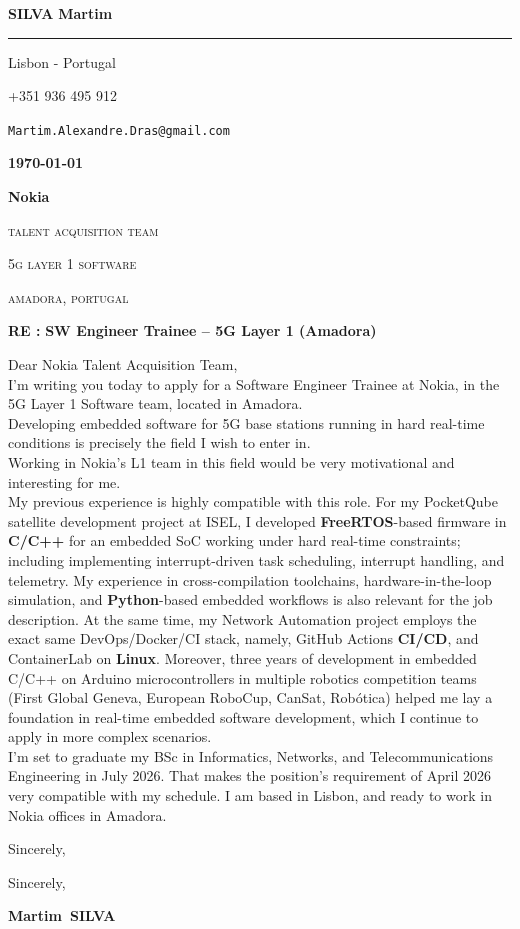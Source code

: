 \documentclass[12pt]{article}
\newcommand{\firstname}{Martim}
\newcommand{\lastname}{Silva}
\newcommand{\mainColor}{nokiaBlue}
\newlength{\spacebox}
\newcommand{\shspace}{\hspace*{0.8em}}
\newcommand{\xvspace}{\vspace*{0.1em}}
\newcommand{\svspace}{\vspace*{0.5em}}
\newcommand{\mvspace}{\vspace*{1.5em}}
\newcommand{\hvspace}{\vspace*{2.5em}}
\newcommand{\negmvspace}{\vspace*{-1em}}
\newcommand{\userInfo}[4]{
    \begin{flushleft}
        \color{\mainColor}
        \Huge
        \textbf{\MakeUppercase{\lastname}}
        \color{black}
        \textbf{\firstname}
        \color{\mainColor}
        \noindent\rule{19.1cm}{0.8pt}
        \color{grayShy}
        \small
        \par
        \parbox{7\spacebox} {
            \faMap \shspace #1 - #2 \par \svspace
            \faPhone \shspace #3 \par \svspace
            \faEnvelopeOpen \shspace \texttt{#4} \par \svspace
        }
        \color{\mainColor}
        \mvspace
    \end{flushleft}
    \negmvspace
}
\newcommand{\companyInfo}[4]{
    \begin{flushright}
        \parbox{4\spacebox}{
            \raggedleft
            \small
            \textbf{\today}\par
            \xvspace
            \textbf{#1}\par
            \mvspace
            \color{grayShy} \textsc{\MakeLowercase{#2}}\par
            \xvspace
            \textsc{\MakeLowercase{#3}}\par
            \xvspace
            \textsc{\MakeLowercase{#4}}\par
            \color{black}
        }
    \end{flushright}
    \hvspace
}
\newcommand{\object}[1]{
    \small
    \color{\mainColor} \textbf{RE :} \color{black} \textbf{#1} \par
}
\newcommand{\content}[2]{
    \mvspace
    \begin{flushleft}
        \parbox{10.3\spacebox}{
          #1\par
          \svspace
          #2
        }\par
    \end{flushleft}
}
\newcommand{\signature}{
    \svspace
    \parbox{3\spacebox}{
      Sincerely,\par
      \svspace \hspace{-0.3em}
      \textbf{\color{\mainColor} \firstname\ \MakeUppercase{\lastname}}\par
      \svspace \svspace
      \Huge \faPenNib\par
    }\par
}
\begin{document}
\selectfont
\userInfo{Lisbon}{Portugal}{+351 936 495 912}{Martim.Alexandre.Dras@gmail.com}
\companyInfo{Nokia}{Talent Acquisition Team}{5G Layer 1 Software}{Amadora, Portugal}
\object{SW Engineer Trainee -- 5G Layer 1 (Amadora)}
\content{
  Dear Nokia Talent Acquisition Team, \\

  I'm writing you today to apply for a Software Engineer Trainee at Nokia, in the
  5G Layer 1 Software team, located in Amadora. \\

  Developing embedded software for 5G base stations running in hard real-time
  conditions is precisely the field I wish to enter in. \\

  Working in Nokia's L1 team in this field would be very motivational and
  interesting for me. \\

  My previous experience is highly compatible with this role. For my PocketQube
  satellite development project at ISEL, I developed \textbf{FreeRTOS}-based
  firmware in \textbf{C/C++} for an embedded SoC working under hard real-time
  constraints; including implementing interrupt-driven task scheduling, interrupt
  handling, and telemetry. My experience in cross-compilation toolchains,
  hardware-in-the-loop simulation, and \textbf{Python}-based embedded workflows is
  also relevant for the job description. At the same time, my Network Automation
  project employs the exact same DevOps/Docker/CI stack, namely, GitHub Actions
  \textbf{CI/CD}, and ContainerLab on \textbf{Linux}. Moreover, three years of
  development in embedded C/C++ on Arduino microcontrollers in multiple robotics
  competition teams (First Global Geneva, European RoboCup, CanSat, Robótica)
  helped me lay a foundation in real-time embedded software development, which I
  continue to apply in more complex scenarios. \\

  I'm set to graduate my BSc in Informatics, Networks, and Telecommunications
  Engineering in July 2026. That makes the position's requirement of April 2026
  very compatible with my schedule. I am based in Lisbon, and ready to work in
  Nokia offices in Amadora. \\
}{Sincerely,}
\signature
\end{document}
